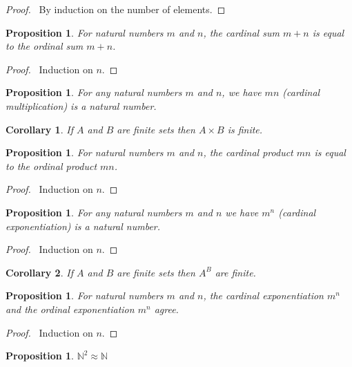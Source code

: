\documentclass{book}
\let\qed\relax
\newtheorem{prop}[ax]{Proposition}
\newtheorem{cor}{Corollary}[ax]
\theoremstyle{definition}
\begin{document}
\begin{proof}
\pf\ By induction on the number of elements. \qed
\end{proof}

\begin{prop}
For natural numbers $m$ and $n$, the cardinal sum $m + n$ is equal to the ordinal sum $m + n$.
\end{prop}

\begin{proof}
\pf\ Induction on $n$. \qed
\end{proof}

\begin{prop}
For any natural numbers $m$ and $n$, we have $mn$ (cardinal multiplication) is a natural number.
\end{prop}

\begin{cor}
If $A$ and $B$ are finite sets then $A \times B$ is finite.
\end{cor}

\begin{prop}
For natural numbers $m$ and $n$, the cardinal product $mn$ is equal to the ordinal product $mn$.
\end{prop}

\begin{proof}
\pf\ Induction on $n$. \qed
\end{proof}

\begin{prop}
For any natural numbers $m$ and $n$ we have $m^n$  (cardinal exponentiation) is a natural number.
\end{prop}

\begin{proof}
\pf\ Induction on $n$.
\end{proof}

\begin{cor}
If $A$ and $B$ are finite sets then $A^B$ are finite.
\end{cor}

\begin{prop}
For natural numbers $m$ and $n$, the cardinal exponentiation $m^n$ and the ordinal exponentiation $m^n$ agree.
\end{prop}

\begin{proof}
\pf\ Induction on $n$. \qed
\end{proof}

\begin{prop}
\label{prop:N^2approxN}
$\mathbb{N}^2 \approx \mathbb{N}$
\end{prop}
\end{document}
